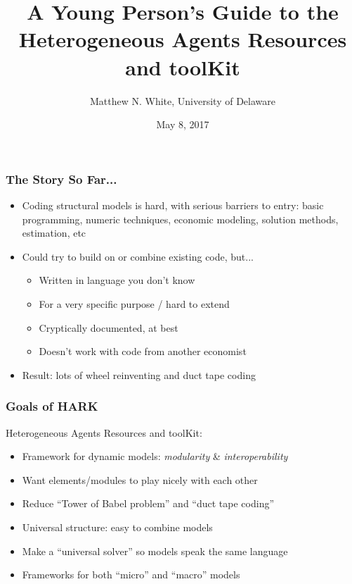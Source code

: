 \documentclass[11pt,handout]{beamer}
\author{Matthew N. White, University of Delaware}
\title{A Young Person's Guide to the \\ Heterogeneous Agents Resources and toolKit}
\date{May 8, 2017}
\newcommand{\bi}{\begin{itemize}}
\newcommand{\ei}{\end{itemize}}
\begin{document}
\begin{frame}
\maketitle
\end{frame}



\begin{frame}
\frametitle{The Story So Far...}
\bi
\item Coding structural models is hard, with serious barriers to entry: basic programming, numeric techniques, economic modeling, solution methods, estimation, etc

\item <2->Could try to build on or combine existing code, but...
\bi
\item Written in language you don't know

\item For a very specific purpose / hard to extend

\item Cryptically documented, at best

\item Doesn't work with code from another economist
\ei

\item <3->Result: lots of wheel reinventing and duct tape coding

\ei
\end{frame}


\begin{frame}
\frametitle{Goals of HARK}
Heterogeneous Agents Resources and toolKit:

\bi
\item <1->Framework for dynamic models: \textit{modularity} \& \textit{interoperability}

\item <1->Want elements/modules to play nicely with each other

\item <1->Reduce ``Tower of Babel problem'' and ``duct tape coding''

\item <2->Universal structure: easy to combine models

\item <2->Make a ``universal solver'' so models speak the same language

\item <2->Frameworks for both ``micro'' and ``macro'' models
\ei
\end{frame}
\end{document}
